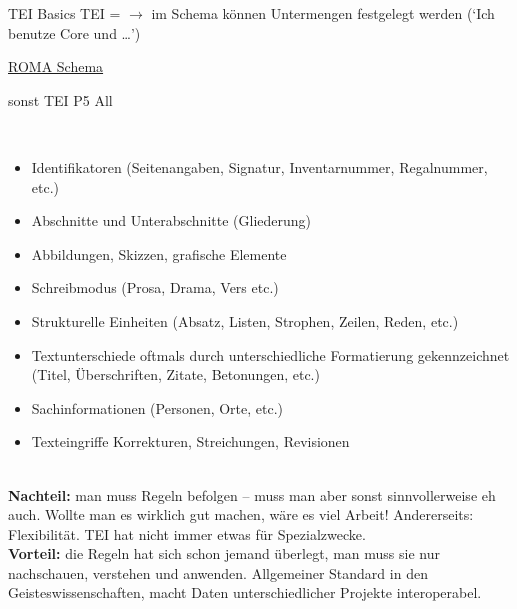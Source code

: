 \begin{frame}[allowframebreaks]{TEI Basics}
\footnotesize
TEI =  $\to$ im Schema können Untermengen festgelegt werden (`Ich benutze Core und \dots ') \item \href{http://www.tei-c.org/Roma/}{ROMA Schema} \item sonst TEI P5 All
\smallskip

 \\

\begin{itemize}\footnotesize
    \item Identifikatoren (Seitenangaben, Signatur, Inventarnummer, Regalnummer, etc.)
    \item Abschnitte und Unterabschnitte (Gliederung)
    \item Abbildungen, Skizzen, grafische Elemente
    \item Schreibmodus (Prosa, Drama, Vers etc.)
    \item Strukturelle Einheiten (Absatz, Listen, Strophen, Zeilen, Reden, etc.)
    \item Textunterschiede oftmals durch unterschiedliche Formatierung gekennzeichnet (Titel, Überschriften, Zitate, Betonungen, etc.)
    \item Sachinformationen (Personen, Orte, etc.)
    \item Texteingriffe Korrekturen, Streichungen, Revisionen
\end{itemize}
\vspace{1em}

 \\
\textbf{Nachteil:} man muss Regeln befolgen -- muss man aber sonst sinnvollerweise eh auch. Wollte man es wirklich gut machen, wäre es viel Arbeit! Andererseits: Flexibilität. TEI hat nicht immer etwas für Spezialzwecke. \\
\textbf{Vorteil:} die Regeln hat sich schon jemand überlegt, man muss sie nur nachschauen, verstehen und anwenden. Allgemeiner Standard in den Geisteswissenschaften, macht Daten unterschiedlicher Projekte interoperabel.
\end{frame}


